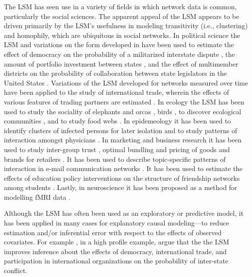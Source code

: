 \documentclass[11pt]{article}
\begin{document}
The LSM has seen use in a variety of fields in which network data is common, particularly the social sciences. The apparent appeal of the LSM appears to be driven primarily by the LSM's usefulness in modeling transitivity (i.e., clustering) and homophily, which are ubiquitous in social networks. In political science the LSM and variations on the form developed in \cite{hoff2002latent} have been used to estimate the effect of democracy on the probability of a militarized interstate dispute \citep{ward2007disputes}, the amount of portfolio investment between states \citep{cao2013democracies}, and the effect of multimember districts on the probability of collaboration between state legislators in the United States \citep{kirkland2012multimember}. Variations of the LSM developed for networks measured over time have been applied to the study of international trade, wherein the effects of various features of trading partners are estimated \citep{ward2013gravity}. In ecology the LSM has been used to study the sociality of elephants \citep{vance2009social} and orcas \citep{fearnbach2014spatial}, birds \citep{nomano2015unrelated}, to discover ecological communities \citep{fletcher2011social, fletcher2013network}, and to study food webs \citep{chiu2011unifying}. In epidemeology it has been used to identify clusters of infected persons for later isolation \citep{zhang2015cluster} and to study patterns of interaction amongst physicians \citep{paul2014results}. In marketing and business research it has been used to study inter-group trust \citep{dass2011impact}, optimal bundling and pricing of goods and brands for retailers \citep{dass2012assessing}. It has been used to describe topic-specific patterns of interaction in e-mail communication networks \citep{krafft2012topic}.  It has been used to estimate the effects of education policy interventions on the structure of friendship networks among students \citep{sweet2011modeling}. Lastly, in neuroscience it has been proposed as a method for modelling fMRI data \citep{simpson2013analyzing}.


Although the LSM has often been used as an exploratory or predictive model, it has been applied in many cases for explanatory causal modeling---to reduce estimation and/or inferential error with respect to the effects of observed covariates. For example \citet{ward2007disputes}, in a high profile example, argue that the the LSM improves inference about the effects of democracy, international trade, and participation in international organizations on the probability of inter-state conflict.
\end{document}
